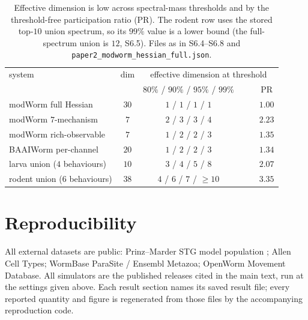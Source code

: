 \documentclass[11pt]{article}
\begin{document}
\begin{table}[H]\centering\small
\begin{tabular}{lccccc}
\toprule
system & dim & \multicolumn{4}{c}{effective dimension at threshold} \\
 & & $80\%$ / $90\%$ / $95\%$ / $99\%$ & & & PR \\
\midrule
modWorm full Hessian & $30$ & $1$ / $1$ / $1$ / $1$ & & & $1.00$ \\
modWorm $7$-mechanism & $7$ & $2$ / $3$ / $3$ / $4$ & & & $2.23$ \\
modWorm rich-observable & $7$ & $1$ / $2$ / $2$ / $3$ & & & $1.35$ \\
BAAIWorm per-channel & $20$ & $1$ / $2$ / $2$ / $3$ & & & $1.34$ \\
larva union ($4$ behaviours) & $10$ & $3$ / $4$ / $5$ / $8$ & & & $2.07$ \\
rodent union ($6$ behaviours) & $38$ & $4$ / $6$ / $7$ / $\ge 10$ & & & $3.35$ \\
\bottomrule
\end{tabular}
\caption{Effective dimension is low across spectral-mass thresholds and by the threshold-free participation ratio (PR). The rodent row uses the stored top-$10$ union spectrum, so its $99\%$ value is a lower bound (the full-spectrum union is $12$, S6.5). Files as in S6.4--S6.8 and \texttt{paper2\_modworm\_hessian\_full.json}.}
\label{tab:thr}
\end{table}

\section{Reproducibility}
All external datasets are public: Prinz--Marder STG model population \citep{prinz2004similar}; Allen Cell Types; WormBase ParaSite / Ensembl Metazoa; OpenWorm Movement Database. All simulators are the published releases cited in the main text, run at the settings given above. Each result section names its saved result file; every reported quantity and figure is regenerated from those files by the accompanying reproduction code.



\end{document}
